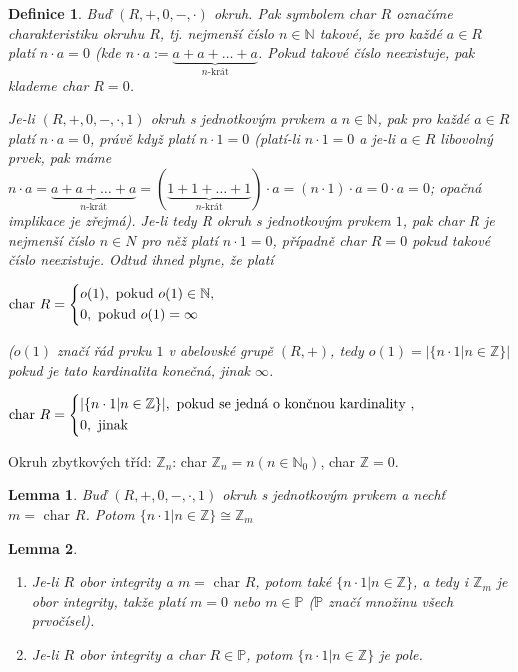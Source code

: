 \documentclass[a4paper, 11pt]{report}
\newtheorem{mydef}{Definice}[chapter]
\newtheorem{lemma}{Lemma}
\begin{document}
\begin{mydef}
Buď $(R, +, 0, -, \cdot)$ okruh. Pak symbolem char $R$ označíme charakteristiku okruhu $R$, tj. nejmenší číslo $n \in \mathbb{N}$ takové, že pro každé $a \in R$ platí $n \cdot a = 0$ (kde $n \cdot a := \underbrace{a + a + \dots + a}_{n\text{-krát}}$. Pokud takové číslo neexistuje, pak klademe char $R = 0$.

Je-li $(R, +, 0, -, \cdot, 1)$ okruh s jednotkovým prvkem a $n \in \mathbb{N}$, pak pro každé $a \in R$ platí $n \cdot a = 0$, právě když platí $n \cdot 1 = 0$ (platí-li $n \cdot 1 = 0$ a je-li $a \in R$ libovolný prvek, pak máme $n \cdot a = \underbrace{a + a + \dots + a}_{n\text{-krát}} = (\underbrace{1 + 1 + \dots + 1}_{n\text{-krát}})\cdot a = (n \cdot 1) \cdot a = 0 \cdot a = 0$; opačná implikace je zřejmá). Je-li tedy R okruh s jednotkovým prvkem $1$, pak char R je nejmenší číslo $n \in N$ pro něž platí $n \cdot 1 = 0$, případně char $R = 0$ pokud takové číslo neexistuje. Odtud ihned plyne, že platí

$\text{char }R = \begin{dcases}
o(1), \text{ pokud } o(1) \in \mathbb{N}, \\
0, \text{ pokud } o(1) = \infty
\end{dcases}$

($o(1)$ značí řád prvku $1$ v abelovské grupě $(R, +)$, tedy $o(1) = |\{n \cdot 1 | n \in \mathbb{Z}\}|$ pokud je tato kardinalita konečná, jinak $\infty$.
\end{mydef}

$\text{char }R = \begin{dcases}
|\{n \cdot 1 | n \in \mathbb{Z}\}|, \text{ pokud se jedná o končnou kardinality }, \\
0, \text{ jinak }
\end{dcases}$

Okruh zbytkových tříd: $\mathbb{Z}_n$: char $\mathbb{Z}_n = n (n \in \mathbb{N}_0)$, char $\mathbb{Z} = 0$.

\begin{lemma}
Buď $(R, +, 0, -, \cdot, 1)$ okruh s jednotkovým prvkem a nechť $m = \text{ char }R$. Potom $\{n \cdot 1 | n \in \mathbb{Z}\} \cong \mathbb{Z}_m$
\end{lemma}

\begin{lemma}
\begin{enumerate}[1)]
	\item Je-li $R$ obor integrity a $m = \text{ char }R$, potom také $\{n \cdot 1 | n \in \mathbb{Z}\}$, a tedy i $\mathbb{Z}_m$ je obor integrity, takže platí $m=0$ nebo $m \in \mathbb{P}$ ($\mathbb{P}$ značí množinu všech prvočísel).
	\item Je-li $R$ obor integrity a char $R \in \mathbb{P}$, potom $\{n \cdot 1 | n \in \mathbb{Z}\}$ je pole.
\end{enumerate}
\end{lemma}
\end{document}
